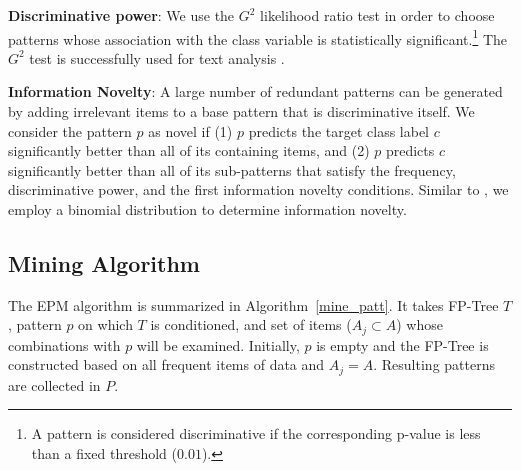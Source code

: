 %
 \noindent\textbf{Discriminative power}: We use the $G^2$ likelihood ratio test \cite{agresti07} in order to 
choose patterns whose association with the class variable 
is statistically significant.\footnote{A pattern is considered discriminative if 
the corresponding p-value is less than a fixed threshold ($0.01$).}
The $G^2$ test is successfully used for text analysis \cite{dunning93}.
%


 \noindent \textbf{Information Novelty}:
A large number of redundant patterns 
can be generated by adding irrelevant items to a base pattern that is discriminative itself.
We consider the pattern $p$ as novel if (1) $p$ predicts the target class label $c$ significantly
better than all of its containing items, and 
(2) $p$ predicts $c$ significantly better than all of its sub-patterns that 
satisfy the frequency, discriminative power,  
and the first information novelty conditions.
Similar to , we employ 
a binomial distribution to determine information novelty.
%
\subsection{Mining Algorithm}
\label{mining}
%
The EPM algorithm is summarized in Algorithm~\ref{mine_patt}.
It takes FP-Tree $T$, pattern $p$ on which $T$ is conditioned, 
and set of items ($A_j \subset A$) whose combinations with $p$ will be examined. 
Initially, $p$ is empty and the FP-Tree is constructed based on all frequent items of data
and $A_j = A$. Resulting patterns are collected in $P$.


